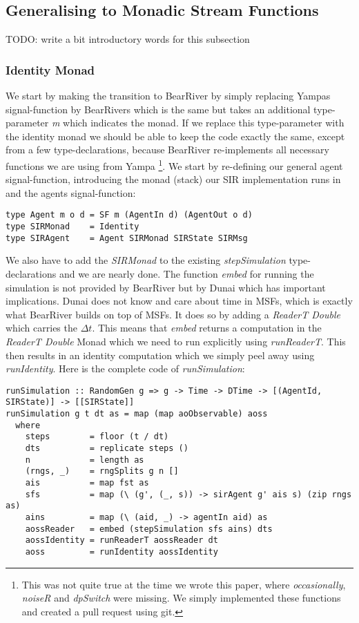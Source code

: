 \subsection{Generalising to Monadic Stream Functions}
TODO: write a bit introductory words for this subsection

\subsubsection{Identity Monad}
We start by making the transition to BearRiver by simply replacing Yampas signal-function by BearRivers which is the same but takes an additional type-parameter \textit{m} which indicates the monad. If we replace this type-parameter with the identity monad we should be able to keep the code exactly the same, except from a few type-declarations, because BearRiver re-implements all necessary functions we are using from Yampa \footnote{This was not quite true at the time we wrote this paper, where \textit{occasionally}, \textit{noiseR} and \textit{dpSwitch} were missing. We simply implemented these functions and created a pull request using git.}.
We start by re-defining our general agent signal-function, introducing the monad (stack) our SIR implementation runs in and the agents signal-function:

\begin{verbatim}
type Agent m o d = SF m (AgentIn d) (AgentOut o d)
type SIRMonad    = Identity
type SIRAgent    = Agent SIRMonad SIRState SIRMsg
\end{verbatim}

We also have to add the \textit{SIRMonad} to the existing \textit{stepSimulation} type-declarations and we are nearly done. The function \textit{embed} for running the simulation is not provided by BearRiver but by Dunai which has important implications. Dunai does not know and care about time in MSFs, which is exactly what BearRiver builds on top of MSFs. It does so by adding a \textit{ReaderT Double} which carries the $\Delta t$. This means that \textit{embed} returns a computation in the \textit{ReaderT Double} Monad which we need to run explicitly using \textit{runReaderT}. This then results in an identity computation which we simply peel away using \textit{runIdentity}. Here is the complete code of \textit{runSimulation}:

\begin{verbatim}
runSimulation :: RandomGen g => g -> Time -> DTime -> [(AgentId, SIRState)] -> [[SIRState]]
runSimulation g t dt as = map (map aoObservable) aoss
  where
    steps        = floor (t / dt)
    dts          = replicate steps ()
    n            = length as
    (rngs, _)    = rngSplits g n []
    ais          = map fst as
    sfs          = map (\ (g', (_, s)) -> sirAgent g' ais s) (zip rngs as)
    ains         = map (\ (aid, _) -> agentIn aid) as
    aossReader   = embed (stepSimulation sfs ains) dts
    aossIdentity = runReaderT aossReader dt
    aoss         = runIdentity aossIdentity
\end{verbatim}

